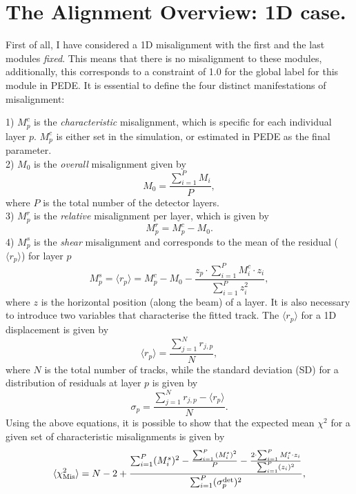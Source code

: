\documentclass[a4paper,11pt]{article}
\begin{document}
\section{The Alignment Overview: 1D case.}
First of all, I have considered a 1D misalignment with the first and the last modules \textit{fixed}. This means that there is no misalignment to these modules, additionally, this corresponds to a constraint of 1.0 for the global label for this module in PEDE. It is essential to define the four distinct manifestations of misalignment:

1) $M^{c}_p$ is the \textit{characteristic} misalignment, which is specific for each individual layer $p$. $M^{c}_p$ is either set in the simulation, or estimated in PEDE as the final parameter. \\
2) $M_0$ is the \textit{overall} misalignment given by
\begin{equation}
M_0 = \frac{\sum_{i=1}^{P} M_i}{P},
\end{equation}
where $P$ is the total number of the detector layers.\\
3) $M^r_p$ is the \textit{relative} misalignment per layer, which is given by
\begin{equation}
M^r_p=M^{c}_p-M_0.
\end{equation}
4) $M^{s}_p$ is the \textit{shear} misalignment and corresponds to the mean of the residual ($\langle r_p \rangle$) for layer $p$
\begin{equation}
M^{s}_p = \langle r_p \rangle =  M^{c}_p  - M_0 - \frac{z_p\cdot \sum_{i=1}^{P}{ M^{c}_i \cdot z_i}}{\sum_{i=1}^{P}{z_i^2}},
\label{eq:shear}
\end{equation}
where $z$ is the horizontal position (along the beam) of a layer. It is also necessary to introduce two variables that characterise the fitted track.
The $\langle r_p \rangle$ for a 1D displacement is given by
\begin{equation}
\langle r_p \rangle = \frac{\sum_{j=1}^{N}{r_{j,p}}}{N},
\end{equation}
where $N$ is the total number of tracks, while the standard deviation (SD) for a distribution of residuals at layer $p$ is given by
\begin{equation}
\sigma_p = \frac{\sum_{j=1}^{N}{r_{j,p} - \langle r_p \rangle}}{N}.
\end{equation}
Using the above equations, it is possible to show that the expected mean $\chi^2$ for a given set of characteristic misalignments is given by
\begin{equation}
\langle \chi^2_{\rm{Mis}} \rangle = N - 2 +  \frac{
	\sum_{i=1}^{P}(M^{s}_i)^2-\frac{\sum_{i=1}^{P}{(M^{s}_i)^2}}{P} - 
	\frac{2 \cdot \sum_{i=1}^{P}M^{s}_i \cdot z_i}{\sum_{i=1}^{P}(z_i)^2}}
{\sum_{i=1}^{P}(\sigma_p^{\mathrm{det}})^2},
\label{eq:chi2}
\end{equation}
\end{document}
